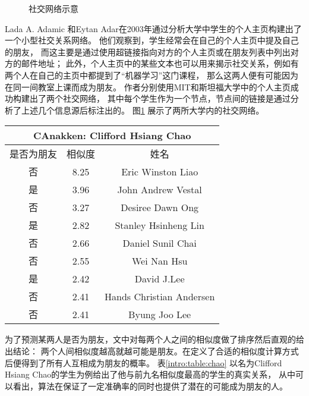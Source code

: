\begin{figure}[h]
  \caption{社交网络示意}
  \label{intro:fig:social_net}
\end{figure}
Lada A. Adamic 和Eytan Adar在2003年通过分析大学中学生的个人主页构建出了一个小型社交关系网络\cite{adamic2003friends}。
他们观察到，学生经常会在自己的个人主页中提及自己的朋友，
而这主要是通过使用超链接指向对方的个人主页或在朋友列表中列出对方的邮件地址；
此外，个人主页中的某些文本也可以用来揭示社交关系，例如有两个人在自己的主页中都提到了“机器学习”这门课程，
那么这两人便有可能因为在同一间教室上课而成为朋友。
作者分别使用MIT和斯坦福大学中的个人主页成功构建出了两个社交网络，
其中每个学生作为一个节点，节点间的链接是通过分析了上述几个信息源后标注出的。
图\ref{intro:fig:social_net} 展示了两所大学内的社交网络。

\zihaowu
\begin{center}
\begin{tabular}{ccc}\hline
\multicolumn{3}{c}{ CAnakken: Clifford Hsiang Chao} \\ \hline
  是否为朋友 &    相似度 &   姓名 \\ \hline
  否 & 8.25 & Eric Winston Liao \\
  是 & 3.96 & John Andrew Vestal \\
  否 & 3.27 & Desiree Dawn Ong \\
  是 & 2.82 & Stanley Hsinheng Lin \\
  否 & 2.66 & Daniel Sunil Chai \\
  否 & 2.55 & Wei Nan Hsu \\
  是 & 2.42 & David J.Lee \\
  否 & 2.41 & Hands Christian Andersen \\
  否 & 2.41 & Byung Joo Lee \\ \hline
\end{tabular}
\label{intro:table:chao}
\end{center}
\zihaoxiaosi

为了预测某两人是否为朋友，文中对每两个人之间的相似度做了排序然后直观的给出结论：
两个人间相似度越高就越可能是朋友。在定义了合适的相似度计算方式后便得到了所有人互相成为朋友的概率。
表\ref{intro:table:chao} 以名为Clifford Hsiang Chao的学生为例给出了他与前九名相似度最高的学生的真实关系，
从中可以看出，算法在保证了一定准确率的同时也提供了潜在的可能成为朋友的人。


